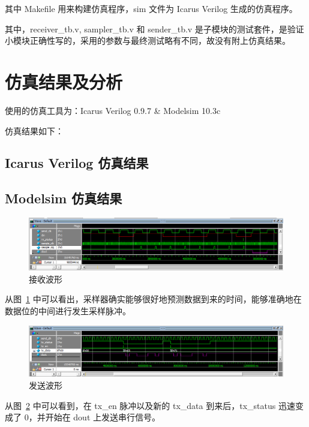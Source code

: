 \documentclass[11pt,a4paper]{article}
\begin{document}
其中 Makefile 用来构建仿真程序，sim 文件为 Icarus Verilog 生成的仿真程序。

其中，receiver\_tb.v, sampler\_tb.v 和 sender\_tb.v 是子模块的测试套件，是验证小模块正确性写的，采用的参数与最终测试略有不同，故没有附上仿真结果。


\section{仿真结果及分析}
使用的仿真工具为：Icarus Verilog 0.9.7 \& Modelsim 10.3c

仿真结果如下：

\subsection{Icarus Verilog 仿真结果}

\subsection{Modelsim 仿真结果}
\begin{figure}[htb]
  \centering
    \includegraphics[width=\textwidth]{exp4_receive_wave}
  \caption{接收波形}
  \label{fig:接收波形}
\end{figure}

从图~\ref{fig:接收波形} 中可以看出，采样器确实能够很好地预测数据到来的时间，能够准确地在数据位的中间进行发生采样脉冲。

\begin{figure}[htb]
  \centering
    \includegraphics[width=\textwidth]{exp4_send_wave}
  \caption{发送波形}
  \label{fig:发送波形}
\end{figure}

从图~\ref{fig:发送波形} 中可以看到，在 tx\_en 脉冲以及新的 tx\_data 到来后，tx\_status 迅速变成了 0，并开始在 dout 上发送串行信号。
\end{document}
